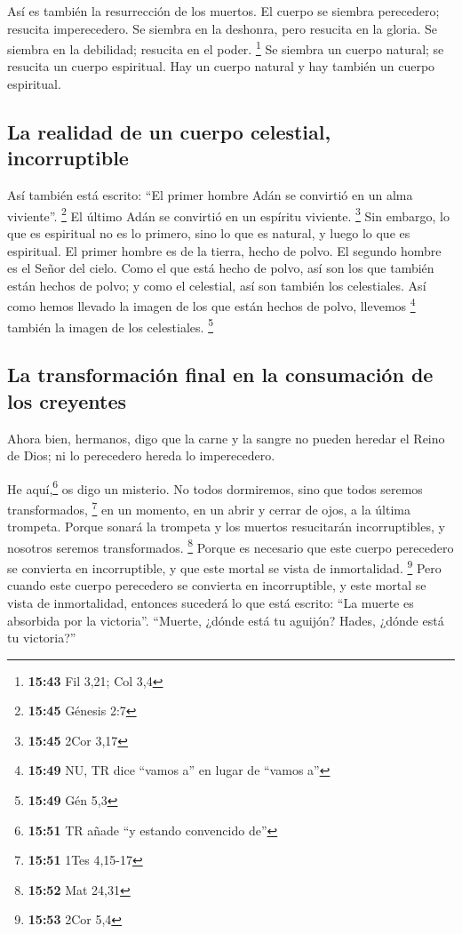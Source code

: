  Así es también la resurrección de los muertos. El cuerpo
se siembra perecedero; resucita imperecedero.  Se siembra
en la deshonra, pero resucita en la gloria. Se siembra en la debilidad;
resucita en el poder. \footnote{\textbf{15:43} Fil 3,21; Col 3,4}
 Se siembra un cuerpo natural; se resucita un cuerpo
espiritual. Hay un cuerpo natural y hay también un cuerpo espiritual.

\hypertarget{la-realidad-de-un-cuerpo-celestial-incorruptible}{%
\subsection{La realidad de un cuerpo celestial,
incorruptible}\label{la-realidad-de-un-cuerpo-celestial-incorruptible}}

 Así también está escrito: ``El primer hombre Adán se
convirtió en un alma viviente''. \footnote{\textbf{15:45} Génesis 2:7}
El último Adán se convirtió en un espíritu viviente. \footnote{\textbf{15:45}
  2Cor 3,17}  Sin embargo, lo que es espiritual no es lo
primero, sino lo que es natural, y luego lo que es espiritual.
 El primer hombre es de la tierra, hecho de polvo. El
segundo hombre es el Señor del cielo.  Como el que está
hecho de polvo, así son los que también están hechos de polvo; y como el
celestial, así son también los celestiales.  Así como
hemos llevado la imagen de los que están hechos de polvo, llevemos
\footnote{\textbf{15:49} NU, TR dice ``vamos a'' en lugar de ``vamos a''}
también la imagen de los celestiales. \footnote{\textbf{15:49} Gén 5,3}

\hypertarget{la-transformaciuxf3n-final-en-la-consumaciuxf3n-de-los-creyentes}{%
\subsection{La transformación final en la consumación de los
creyentes}\label{la-transformaciuxf3n-final-en-la-consumaciuxf3n-de-los-creyentes}}

 Ahora bien, hermanos, digo que la carne y la sangre no
pueden heredar el Reino de Dios; ni lo perecedero hereda lo
imperecedero.

 He aquí,\footnote{\textbf{15:51} TR añade ``y estando
  convencido de''} os digo un misterio. No todos dormiremos, sino que
todos seremos transformados, \footnote{\textbf{15:51} 1Tes 4,15-17}
 en un momento, en un abrir y cerrar de ojos, a la última
trompeta. Porque sonará la trompeta y los muertos resucitarán
incorruptibles, y nosotros seremos transformados. \footnote{\textbf{15:52}
  Mat 24,31}  Porque es necesario que este cuerpo
perecedero se convierta en incorruptible, y que este mortal se vista de
inmortalidad. \footnote{\textbf{15:53} 2Cor 5,4}  Pero
cuando este cuerpo perecedero se convierta en incorruptible, y este
mortal se vista de inmortalidad, entonces sucederá lo que está escrito:
``La muerte es absorbida por la victoria''.  ``Muerte,
¿dónde está tu aguijón? Hades, ¿dónde está tu victoria?''

